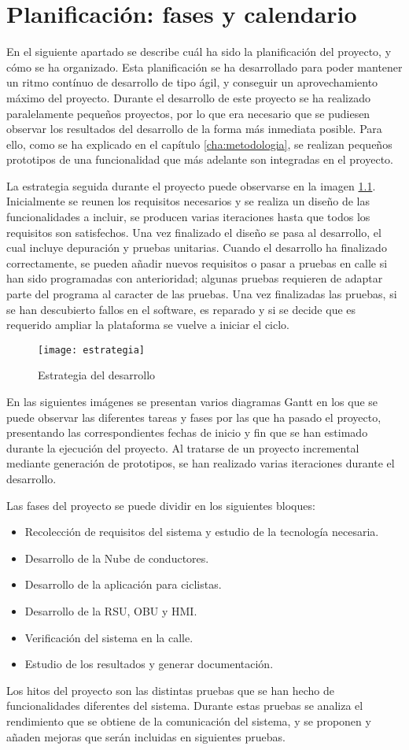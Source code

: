 \chapter{Planificación: fases y calendario}
En el siguiente apartado se describe cuál ha sido la planificación del proyecto, y cómo se ha organizado. Esta planificación se ha desarrollado para poder mantener un ritmo contínuo de desarrollo de tipo ágil, y conseguir un aprovechamiento máximo del proyecto. Durante el desarrollo de este proyecto se ha realizado paralelamente pequeños proyectos, por lo que era necesario que se pudiesen observar los resultados del desarrollo de la forma más inmediata posible. Para ello, como se ha explicado en el capítulo \ref{cha:metodologia}, se realizan pequeños prototipos de una funcionalidad que más adelante son integradas en el proyecto.

La estrategia seguida durante el proyecto puede observarse en la imagen \ref{fig:estrategia}. Inicialmente se reunen los requisitos necesarios y se realiza un diseño de las funcionalidades a incluir, se producen varias iteraciones hasta que todos los requisitos son satisfechos. Una vez finalizado el diseño se pasa al desarrollo, el cual incluye depuración y pruebas unitarias. Cuando el desarrollo ha finalizado correctamente, se pueden añadir nuevos requisitos o pasar a pruebas en calle si han sido programadas con anterioridad; algunas pruebas requieren de adaptar parte del programa al caracter de las pruebas. Una vez finalizadas las pruebas, si se han descubierto fallos en el software, es reparado y si se decide que es requerido ampliar la plataforma se vuelve a iniciar el ciclo. 
\begin{figure}[H]
	\begin{center}
		\texttt{[image: estrategia]}
		\caption{Estrategia del desarrollo}
		\label{fig:estrategia}
	\end{center}
\end{figure}

En las siguientes imágenes se presentan varios diagramas Gantt en los que se puede observar las diferentes tareas y fases por las que ha pasado el proyecto, presentando las correspondientes fechas de inicio y fin que se han estimado durante la ejecución del proyecto. Al tratarse de un proyecto incremental mediante generación de prototipos, se han realizado varias iteraciones durante el desarrollo.

Las fases del proyecto se puede dividir en los siguientes bloques:
\begin{itemize}
	\item Recolección de requisitos del sistema y estudio de la tecnología necesaria.
	\item Desarrollo de la Nube de conductores.
	\item Desarrollo de la aplicación para ciclistas.
	\item Desarrollo de la RSU, OBU y HMI.
	\item Verificación del sistema en la calle.
	\item Estudio de los resultados y generar documentación.
\end{itemize}

Los hitos del proyecto son las distintas pruebas que se han hecho de funcionalidades diferentes del sistema. Durante estas pruebas se analiza el rendimiento que se obtiene de la comunicación del sistema, y se proponen y añaden mejoras que serán incluidas en siguientes pruebas.

